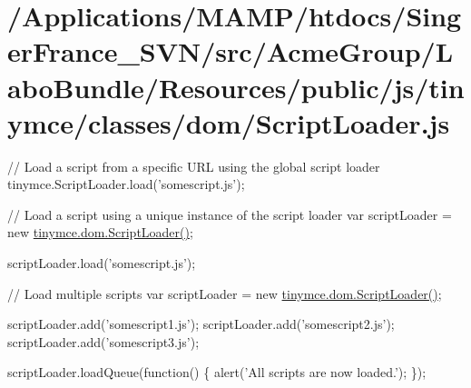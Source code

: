 \hypertarget{_2_applications_2_m_a_m_p_2htdocs_2_singer_france__s_v_n_2src_2_acme_group_2_labo_bundle_2_resou80adc1ba549670ec68958e39d46dc4e2}{\section{/\+Applications/\+M\+A\+M\+P/htdocs/\+Singer\+France\+\_\+\+S\+V\+N/src/\+Acme\+Group/\+Labo\+Bundle/\+Resources/public/js/tinymce/classes/dom/\+Script\+Loader.\+js}
}
// Load a script from a specific U\+R\+L using the global script loader tinymce.\+Script\+Loader.\+load('somescript.\+js');

// Load a script using a unique instance of the script loader var script\+Loader = new \hyperlink{classtinymce_1_1dom_1_1_script_loader}{tinymce.\+dom.\+Script\+Loader()};

script\+Loader.\+load('somescript.\+js');

// Load multiple scripts var script\+Loader = new \hyperlink{classtinymce_1_1dom_1_1_script_loader}{tinymce.\+dom.\+Script\+Loader()};

script\+Loader.\+add('somescript1.\+js'); script\+Loader.\+add('somescript2.\+js'); script\+Loader.\+add('somescript3.\+js');

script\+Loader.\+load\+Queue(function() \{ alert('All scripts are now loaded.'); \});


\begin{DoxyCodeInclude}
\end{DoxyCodeInclude}
 